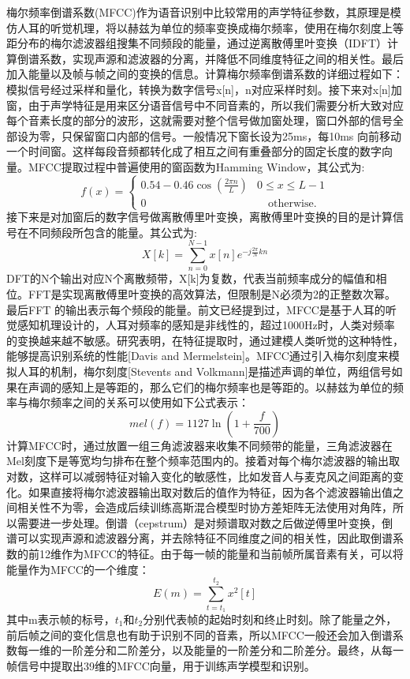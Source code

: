 梅尔频率倒谱系数(MFCC)作为语音识别中比较常用的声学特征参数，其原理是模仿人耳的听觉机理，将以赫兹为单位的频率变换成梅尔频率，使用在梅尔刻度上等距分布的梅尔滤波器组搜集不同频段的能量，通过逆离散傅里叶变换（IDFT）计算倒谱系数，实现声源和滤波器的分离，并降低不同维度特征之间的相关性。最后加入能量以及帧与帧之间的变换的信息。计算梅尔频率倒谱系数的详细过程如下：模拟信号经过采样和量化，转换为数字信号x[n]，n对应采样时刻。接下来对x[n]加窗，由于声学特征是用来区分语音信号中不同音素的，所以我们需要分析大致对应每个音素长度的部分的波形，这就需要对整个信号做加窗处理，窗口外部的信号全部设为零，只保留窗口内部的信号。一般情况下窗长设为25ms，每10ms 向前移动一个时间窗。这样每段音频都转化成了相互之间有重叠部分的固定长度的数字向量。MFCC提取过程中普遍使用的窗函数为Hamming Window，其公式为:
\begin{equation}
  f(x)=
    \begin{cases}
      0.54 - 0.46\cos(\frac{2{\pi}n}{L}) & 0\leq x\leq L-1 \\
      \text{0} &\quad\text{otherwise.} \
    \end{cases}
\end{equation}
接下来是对加窗后的数字信号做离散傅里叶变换，离散傅里叶变换的目的是计算信号在不同频段所包含的能量。其公式为:\begin{equation}X[k]=\sum_{n=0}^{N-1} x[n]{e^{-j\frac{2\pi}{N}k{n}}}\end{equation}DFT的N个输出对应N个离散频带，X[k]为复数，代表当前频率成分的幅值和相位。FFT是实现离散傅里叶变换的高效算法，但限制是N必须为2的正整数次幂。最后FFT 的输出表示每个频段的能量。前文已经提到过，MFCC是基于人耳的听觉感知机理设计的，人耳对频率的感知是非线性的，超过1000Hz时，人类对频率的变换越来越不敏感。研究表明，在特征提取时，通过建模人类听觉的这种特性，能够提高识别系统的性能[Davis and Mermelstein]。MFCC通过引入梅尔刻度来模拟人耳的机制，梅尔刻度[Stevents and Volkmann]是描述声调的单位，两组信号如果在声调的感知上是等距的，那么它们的梅尔频率也是等距的。以赫兹为单位的频率与梅尔频率之间的关系可以使用如下公式表示：\begin{equation}mel(f)=1127\ln(1+\frac{f}{700})\end{equation}计算MFCC时，通过放置一组三角滤波器来收集不同频带的能量，三角滤波器在Mel刻度下是等宽均匀排布在整个频率范围内的。接着对每个梅尔滤波器的输出取对数，这样可以减弱特征对输入变化的敏感性，比如发音人与麦克风之间距离的变化。如果直接将梅尔滤波器输出取对数后的值作为特征，因为各个滤波器输出值之间相关性不为零，会造成后续训练高斯混合模型时协方差矩阵无法使用对角阵，所以需要进一步处理。倒谱（cepstrum）是对频谱取对数之后做逆傅里叶变换，倒谱可以实现声源和滤波器分离，并去除特征不同维度之间的相关性，因此取倒谱系数的前12维作为MFCC的特征。由于每一帧的能量和当前帧所属音素有关，可以将能量作为MFCC的一个维度：\begin{equation}E(m) = \sum_{t=t_1}^{t_2} x^2[t]\end{equation}
其中m表示帧的标号，$t_1$和$t_2$分别代表帧的起始时刻和终止时刻。除了能量之外，前后帧之间的变化信息也有助于识别不同的音素，所以MFCC一般还会加入倒谱系数每一维的一阶差分和二阶差分，以及能量的一阶差分和二阶差分。最终，从每一帧信号中提取出39维的MFCC向量，用于训练声学模型和识别。
